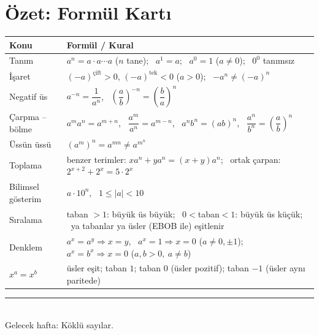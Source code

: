 \documentclass[11pt,a4paper]{article}
\newcounter{alis}
\begin{document}
\section{Özet: Formül Kartı}
\begin{center}
\renewcommand{\arraystretch}{1.6}
\begin{tabular}{@{}lp{12.9cm}@{}}
\toprule
Konu & Formül / Kural\\\midrule
Tanım & \(a^n=a\cdot a\cdots a\) (\(n\) tane); \ \(a^1=a\); \ \(a^0=1\) (\(a\neq 0\)); \ \(0^0\) tanımsız\\
İşaret & \((-a)^{\text{çift}}>0\), \((-a)^{\text{tek}}<0\) (\(a>0\)); \ \(-a^n\neq(-a)^n\)\\
Negatif üs & \(a^{-n}=\dfrac{1}{a^n}\), \ \(\left(\dfrac ab\right)^{-n}=\left(\dfrac ba\right)^n\)\\
Çarpma -- bölme & \(a^m a^n=a^{m+n}\), \ \(\dfrac{a^m}{a^n}=a^{m-n}\), \ \(a^nb^n=(ab)^n\), \ \(\dfrac{a^n}{b^n}=\left(\dfrac ab\right)^n\)\\
Üssün üssü & \((a^m)^n=a^{mn}\neq a^{m^n}\)\\
Toplama & benzer terimler: \(xa^n+ya^n=(x+y)a^n\); \ ortak çarpan: \(2^{x+2}+2^x=5\cdot 2^x\)\\
Bilimsel gösterim & \(a\cdot 10^n\), \ \(1\le|a|<10\)\\
Sıralama & taban \(>1\): büyük üs büyük; \ \(0<\)taban\(<1\): büyük üs küçük; \ ya tabanlar ya üsler (EBOB ile) eşitlenir\\
Denklem & \(a^x=a^y\Rightarrow x=y\), \ \(a^x=1\Rightarrow x=0\) (\(a\neq 0,\pm1\)); \ \(a^x=b^x\Rightarrow x=0\) (\(a,b>0,\ a\neq b\))\\
\(x^a=x^b\) & üsler eşit; taban \(1\); taban \(0\) (üsler pozitif); taban \(-1\) (üsler aynı paritede)\\\bottomrule
\end{tabular}
\end{center}

\newpage


\vspace{6pt}
\noindent\textcolor{anamavi}{\rule{\textwidth}{0.5pt}}\\
{\small Gelecek hafta: Köklü sayılar.}
\end{document}
